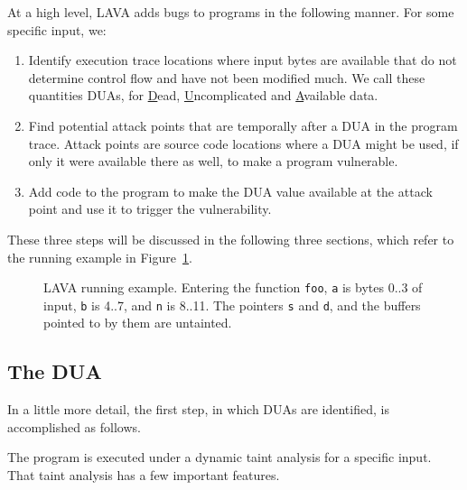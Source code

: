 
At a high level, LAVA adds bugs to programs in the following manner. For some specific input, we:

\begin {enumerate}
\item Identify execution trace locations where input bytes are available that do not determine control flow and have not been modified much. 
We call these quantities DUAs, for \underline{D}ead, \underline{U}ncomplicated and \underline{A}vailable data.
\item Find potential attack points that are temporally after a DUA in the program trace.
Attack points are source code locations where a DUA might be used, if only it were available there as well, to make a program vulnerable. 
\item Add code to the program to make the DUA value available at the attack point and use it to trigger the vulnerability. 
\end{enumerate}

These three steps will be discussed in the following three sections, which refer to the running example in Figure~\ref{fig:worked-example}.

\begin{figure}

\caption{LAVA running example.  
Entering the function \texttt{foo}, \texttt{a} is bytes 0..3 of input, \texttt{b} is 4..7, and \texttt{n} is 8..11.
The pointers \texttt{s} and \texttt{d}, and the buffers pointed to by them are untainted.}
\label{fig:worked-example}
\end{figure}

\subsection {The DUA}

In a little more detail, the first step, in which DUAs are identified, is accomplished as follows.  

The program is executed under a dynamic taint analysis for a specific input.
That taint analysis has a few important features.


